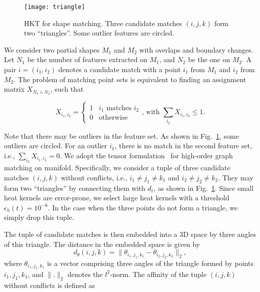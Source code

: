 \begin{figure}
\centering
\texttt{[image: triangle]}
\caption[HKT for feature matching.]
{HKT for shape matching. Three candidate matches $(i,j,k)$ form two ``triangles''. Some outlier features are circled.}
\label{fig:triple}
\end{figure}

We consider two partial shapes $M_{1}$ and $M_{2}$ with overlaps and boundary changes. Let $N_{1}$ be the number of features extracted on $M_{1}$, and $N_{2}$ be the one on $M_{2}$. A pair $i=(i_{1},i_{2})$ denotes a candidate match with a point $i_{1}$ from $M_{1}$ and $i_{2}$ from $M_{2}$. The problem of matching point sets is equivalent to finding an assignment matrix $X_{N_{1}\times N_{2}}$, such that

\begin{equation}
\label{eq:X}
X_{i_{1},i_{2}}=
\begin{cases}
1 & \mbox{$i_{1}$ matches $i_{2}$} \\
0 & \mbox{otherwise}
\end{cases}  \mbox{, with }\sum_{i_{2}}X_{i_{1},i_{2}} \leq 1.
\end{equation}

Note that there may be outliers in the feature set. As shown in Fig.~\ref{fig:triple}, some outliers are circled. For an outlier $i_1$, there is no match in the second feature set, i.e., $\sum_{i_{2}}X_{i_{1},i_{2}}=0$. We adopt the tensor formulation~\cite{Duchenne:CVPR:2011} for high-order graph matching on manifold. Specifically, we consider a tuple of three candidate matches $(i,j,k)$ without conflicts, i.e., $i_{1}\neq j_{1}\neq k_{1}$ and $i_{2}\neq j_{2}\neq k_{2}$. They may form two ``triangles'' by connecting them with $d_t$, as shown in Fig.~\ref{fig:triple}. Since small heat kernels are error-prone, we select large heat kernels with a threshold $\epsilon_h(t)=10^{-6}$. In the case when the three points do not form a triangle, we simply drop this tuple.

The tuple of candidate matches is then embedded into a 3D space by three angles of this triangle. The distance in the embedded space is given by
\begin{equation}
d_{\theta}(i,j,k)=\|\theta_{i_{1},j_{1},k_{1}}-\theta_{i_{2},j_{2},k_{2}}\|_{2},
\end{equation}
where $\theta_{i_{1},j_{1},k_{1}}$ is a vector comprising three angles of the triangle formed by points $i_{1},j_{1},k_{1}$, and $\|.\|_{2}$ denotes the $l^{2}$-norm. The affinity of the tuple $(i,j,k)$ without conflicts is defined as

